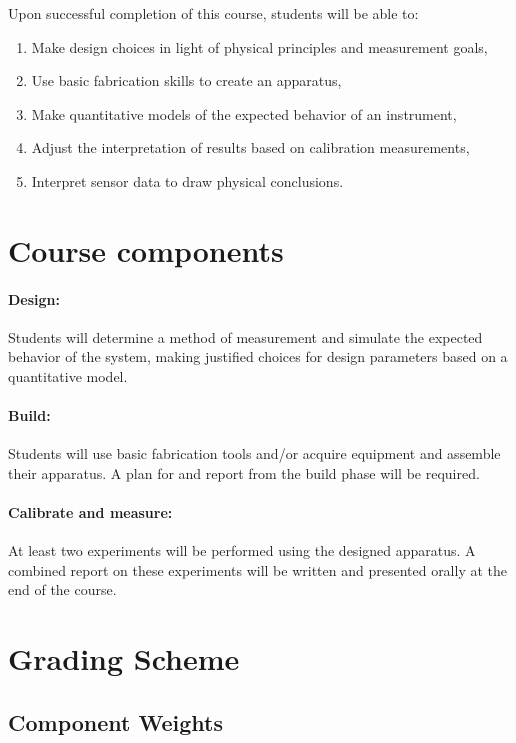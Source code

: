 \documentclass{syllabus}
\begin{document}
Upon successful completion of this course, students will be able to:
\begin{enumerate}[label=\textcolor{CarthageDark}{\bfseries\arabic*.}]
    \item Make design choices in light of physical principles and measurement goals,
    \item Use basic fabrication skills to create an apparatus,
    \item Make quantitative models of the expected behavior of an instrument,
    \item Adjust the interpretation of results based on calibration measurements,
    \item Interpret sensor data to draw physical conclusions.
\end{enumerate}



\section*{Course components}

\paragraph{Design:} Students will determine a method of measurement and simulate the expected behavior of the system, making justified choices for design parameters based on a quantitative model.

\paragraph{Build:} Students will use basic fabrication tools and/or acquire equipment and assemble their apparatus. A plan for and report from the build phase will be required.

\paragraph{Calibrate and measure:} At least two experiments will be performed using the designed apparatus. A combined report on these experiments will be written and presented orally at the end of the course.



\section*{Grading Scheme}
\subsection*{Component Weights}
\end{document}
